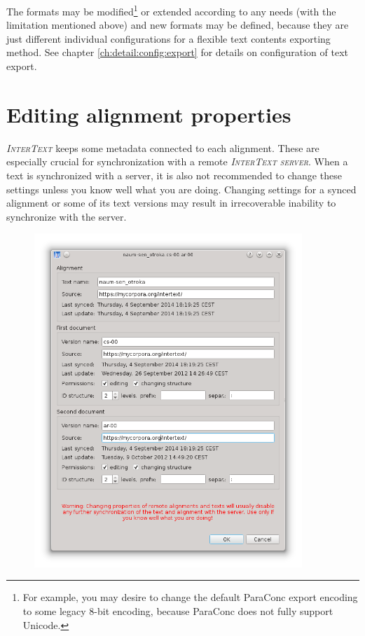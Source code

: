 \documentclass[a4paper,10pt,oneside]{book}
\newcommand{\IT}{\textit{\textsc{InterText}}\xspace}
\newcommand{\ITserver}{\textit{\textsc{InterText server}}\xspace}
\begin{document}
The formats may be modified\footnote{For example, you may desire to change the default ParaConc export encoding to some legacy 8-bit encoding, because ParaConc does not fully support Unicode.} or extended according to any needs (with the limitation mentioned above) and new formats may be defined, because they are just different individual configurations for a flexible text contents exporting method. See chapter \ref{ch:detail:config:export} for details on configuration of text export.

\section{Editing alignment properties}\label{ch:detail:managing_local:properties}

\IT keeps some metadata connected to each alignment. These are especially crucial for synchronization with a remote \ITserver. When a text is synchronized with a server, it is also not recommended to change these settings unless you know well what you are doing. Changing settings for a synced alignment or some of its text versions may result in irrecoverable inability to synchronize with the server.

\begin{figure}[htb]
 \includegraphics[width=0.9\textwidth]{screenshots/properties.png}
\end{figure}
\end{document}
